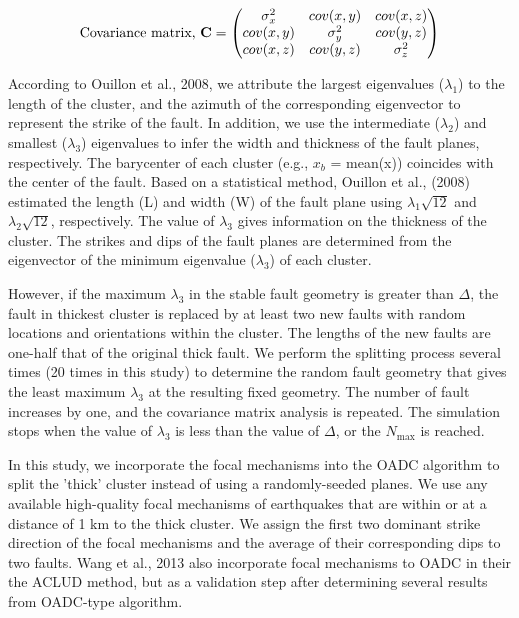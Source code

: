 \documentclass[draft]{agujournal2018}
\begin{document}
\begin{equation}\label{covariance_eqn}
\text{Covariance matrix, \textbf{C}} = \begin{pmatrix} 
\sigma_{x}^2 &  cov(x,y) & cov(x,z)\\ 
cov(x,y) & \sigma_{y}^2 & cov(y,z)\\ 
cov(x,z) & cov(y,z) & \sigma_{z}^2
\end{pmatrix}
\end{equation}

According to Ouillon et al., 2008, we attribute the largest eigenvalues ($\lambda_1$) to the length of the cluster, and the azimuth of the corresponding eigenvector to represent the strike of the fault. In addition, we use the intermediate ($\lambda_2$) and smallest ($\lambda_3$) eigenvalues to infer the width and thickness of the fault planes, respectively. The barycenter of each cluster (e.g., $x_b$ = mean(x)) coincides with the center of the fault. Based on a statistical method, Ouillon et al., (2008) estimated the length (L) and width (W) of the fault plane using  $\lambda_{1}\sqrt{12}$ and $\lambda_{2}\sqrt{12}$, respectively. The value of $\lambda_{3}$ gives information on the thickness of the cluster. The strikes and dips of the fault planes are determined from the eigenvector of the minimum eigenvalue ($\lambda_{3}$) of each cluster.

However, if the maximum $\lambda_{3}$ in the stable fault geometry is greater than $\Delta$, the fault in thickest cluster is replaced by at least two new faults with random locations and orientations within the cluster. The lengths of the new faults are one-half that of the original thick fault. We perform the splitting process several times (20 times in this study) to determine the random fault geometry that gives the least maximum $\lambda_3$ at the resulting fixed geometry. The number of fault increases by one, and the covariance matrix analysis is repeated. The simulation stops when the value of $\lambda_3$ is less than the value of $\Delta$, or the $N_{\max}$ is reached.

In this study, we incorporate the focal mechanisms into the OADC algorithm to split the 'thick' cluster instead of using a randomly-seeded planes. We use any available high-quality focal mechanisms of earthquakes that are within or at a distance of 1 km to the thick cluster. We assign the first two dominant strike direction of the focal mechanisms and the average of their corresponding dips to two faults. %
Wang et al., 2013 also incorporate focal mechanisms to OADC in their the ACLUD method, but as a validation step after determining several results from OADC-type algorithm. 
\end{document}
